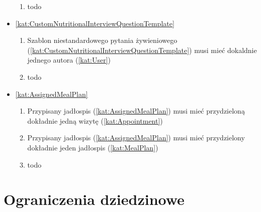 \begin{itemize}[label={\textbf{Reguły dla}}, wide, labelwidth=!, labelindent=0pt]
\begin{enumerate}[label={\textbf{REG/\protect\threedigits{\arabic{enumi}}}}, wide, labelwidth=!, align=left, leftmargin=3cm, resume]
        \item todo
    \end{enumerate}
    \item\ref{kat:CustomNutritionalInterviewQuestionTemplate}
    \begin{enumerate}[label={\textbf{REG/\protect\threedigits{\arabic{enumi}}}}, wide, labelwidth=!, align=left, leftmargin=3cm, resume]
        \item Szablon niestandardowego pytania żywieniowego (\ref{kat:CustomNutritionalInterviewQuestionTemplate}) musi mieć dokaldnie jednego autora (\ref{kat:User})
        \item todo
    \end{enumerate}
    \item\ref{kat:AssignedMealPlan}
    \begin{enumerate}[label={\textbf{REG/\protect\threedigits{\arabic{enumi}}}}, wide, labelwidth=!, align=left, leftmargin=3cm, resume]
        \item Przypisany jadłospis (\ref{kat:AssignedMealPlan}) musi mieć przydzieloną dokładnie jedną wizytę (\ref{kat:Appointment})
        \item Przypisany jadłospis (\ref{kat:AssignedMealPlan}) musi mieć przydzielony dokładnie jeden jadłospis (\ref{kat:MealPlan})
        \item todo
    \end{enumerate}
\end{itemize}

\section{Ograniczenia dziedzinowe}

